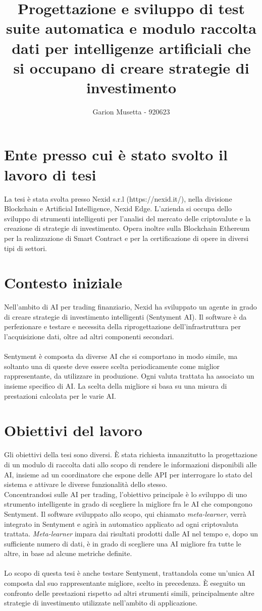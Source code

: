 \documentclass{article}
\title{\textbf{Progettazione e sviluppo di test suite automatica e modulo raccolta dati per intelligenze artificiali che si occupano di creare strategie di investimento}}
\author{Garion Musetta - 920623}
\begin{document}
\maketitle

\section{Ente presso cui è stato svolto il lavoro di tesi}
La tesi è stata svolta presso Nexid s.r.l (https://nexid.it/), nella divisione Blockchain e Artificial Intelligence, Nexid Edge. L'azienda si occupa dello sviluppo di strumenti intelligenti per l'analisi del mercato delle criptovalute e la creazione di strategie di investimento. Opera inoltre sulla Blockchain Ethereum per la realizzazione di Smart Contract e per la certificazione di opere in diversi tipi di settori.

\section{Contesto iniziale}
Nell'ambito di AI per trading finanziario, Nexid ha sviluppato un agente in grado di creare strategie di investimento intelligenti (Sentyment AI). Il software è da perfezionare e testare e necessita della riprogettazione dell'infrastruttura per l'acquisizione dati, oltre ad altri componenti secondari.\\~\\ Sentyment è composta da diverse AI che si comportano in modo simile, ma soltanto una di queste deve essere scelta periodicamente come miglior rappresentante, da utilizzare in produzione. Ogni valuta trattata ha associato un insieme specifico di AI. La scelta della migliore si basa su una misura di prestazioni calcolata per le varie AI.

\section{Obiettivi del lavoro}
Gli obiettivi della tesi sono diversi. È stata richiesta innanzitutto la progettazione di un modulo di raccolta dati allo scopo di rendere le informazioni disponibili alle AI, insieme ad un coordinatore che espone delle API per interrogare lo stato del sistema e attivare le diverse funzionalità dello stesso.\\ Concentrandosi sulle AI per trading, l'obiettivo principale è lo sviluppo di uno strumento intelligente in grado di scegliere la migliore fra le AI che compongono Sentyment. Il software sviluppato allo scopo, qui chiamato \textit{meta-learner}, verrà integrato in Sentyment e agirà in automatico applicato ad ogni criptovaluta trattata. \textit{Meta-learner} impara dai risultati prodotti dalle AI nel tempo e, dopo un sufficiente numero di dati, è in grado di scegliere una AI migliore fra tutte le altre, in base ad alcune metriche definite.\\~\\ Lo scopo di questa tesi è anche testare Sentyment, trattandola come un'unica AI composta dal suo rappresentante migliore, scelto in precedenza. È eseguito un confronto delle prestazioni rispetto ad altri strumenti simili, principalmente altre strategie di investimento utilizzate nell'ambito di applicazione.
\end{document}
